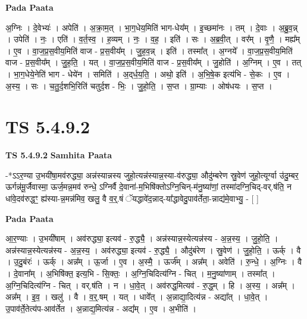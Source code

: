 \documentclass[17pt]{extarticle}
\begin{document}
\textbf{Pada Paata} \newline

अ॒ग्निः । दे॒वेभ्यः॑ । अपेति॑ । अ॒क्रा॒म॒त् । भा॒ग॒धेय॒मिति॑ भाग-धेय᳚म् । इ॒च्छमा॑नः । तम् । दे॒वाः । अ॒ब्रु॒व॒न्न् । उपेति॑ । नः॒ । एति॑ । व॒र्त॒स्व॒ । ह॒व्यम् । नः॒ । व॒ह॒ । इति॑ । सः । अ॒ब्र॒वी॒त् । वर᳚म् । वृ॒णै॒ । मह्य᳚म् । ए॒व । वा॒ज॒प्र॒स॒वीय॒मिति॑ वाज - प्र॒स॒वीय᳚म् । जु॒ह॒व॒न्न् । इति॑ । तस्मा᳚त् । अ॒ग्नये᳚ । वा॒ज॒प्र॒स॒वीय॒मिति॑ वाज - प्र॒स॒वीय᳚म् । जु॒ह॒ति॒ । यत् । वा॒ज॒प्र॒स॒वीय॒मिति॑ वाज - प्र॒स॒वीय᳚म् । जु॒होति॑ । अ॒ग्निम् । ए॒व । तत् । भा॒ग॒धेये॒नेति॑ भाग - धेये॑न । समिति॑ । अ॒द्‌र्ध॒य॒ति॒ । अथो॒ इति॑ । अ॒भि॒षे॒क इत्य॑भि - से॒कः । ए॒व । अ॒स्य॒ । सः । च॒तु॒र्द॒शभि॒रिति॑ चतुर्द॒श - भिः॒ । जु॒हो॒ति॒ । स॒प्त । ग्रा॒म्याः । ओष॑धयः । स॒प्त ।  \newline





\section{ TS 5.4.9.2 }

\textbf{TS 5.4.9.2 } \newline
\textbf{Samhita Paata} \newline

-*ऽऽर॒ण्या उ॒भयी॑षा॒मव॑रुद्ध्या॒ अन्न॑स्यान्नस्य जुहो॒त्यन्न॑स्यान्न॒स्या-व॑रुद्ध्या॒ औदु॑म्बरेण स्रु॒वेण॑ जुहो॒त्यूर्ग्वा उ॑दु॒म्बर॒ ऊर्गन्न॑मू॒र्जैवास्मा॒ ऊर्ज॒मन्न॒मव॑ रुन्धे॒ ऽग्निर्वै दे॒वाना॑-म॒भिषि॑क्तोऽग्नि॒चिन्-म॑नु॒ष्या॑णां॒ तस्मा॑दग्नि॒चिद्-वर्.ष॑ति॒ न धा॑वे॒दव॑रुद्धꣳ॒॒ ह्य॑स्या-न्न॒मन्न॑मिव॒ खलु॒ वै व॒र्॒.षं ॅयद्धावे॑द॒न्नाद्-या᳚द्धावेदु॒पाव॑र्तेता॒-न्नाद्य॑मे॒वाभ्यु॒ - [  ] \newline

\textbf{Pada Paata} \newline

आ॒र॒ण्याः । उ॒भयी॑षाम् । अव॑रुद्ध्या॒ इत्यव॑ - रु॒द्ध्यै॒ । अन्न॑स्यान्न॒स्येत्यन्न॑स्य - अ॒न्न॒स्य॒ । जु॒हो॒ति॒ । अन्न॑स्यान्न॒स्येत्यन्न॑स्य - अ॒न्न॒स्य॒ । अव॑रुद्ध्या॒ इत्यव॑ - रु॒द्ध्यै॒ । औदु॑बंरेण । स्रु॒वेण॑ । जु॒हो॒ति॒ । ऊर्क् । वै । उ॒दु॒बंरः॑ । ऊर्क् । अन्न᳚म् । ऊ॒र्जा । ए॒व । अ॒स्मै॒ । ऊर्ज᳚म् । अन्न᳚म् । अवेति॑ । रु॒न्धे॒ । अ॒ग्निः । वै । दे॒वाना᳚म् । अ॒भिषि॑क्त॒ इत्य॒भि - सि॒क्तः॒ । अ॒ग्नि॒चिदित्य॑ग्नि - चित् । म॒नु॒ष्या॑णाम् । तस्मा᳚त् । अ॒ग्नि॒चिदित्य॑ग्नि - चित् । वर्.ष॑ति । न । धा॒वे॒त् । अव॑रुद्ध॒मित्यव॑ - रु॒द्ध॒म् । हि । अ॒स्य॒ । अन्न᳚म् । अन्न᳚म् । इ॒व॒ । खलु॑ । वै । व॒र्॒.षम् । यत् । धावे᳚त् । अ॒न्नाद्या॒दित्य॑न्न - अद्या᳚त् । धा॒वे॒त् । उ॒पाव॑र्ते॒तेत्य॑प-आव॑र्तेत । अ॒न्नाद्य॒मित्य॑न्न - अद्य᳚म् । ए॒व । अ॒भीति॑ ।  \newline
\end{document}
